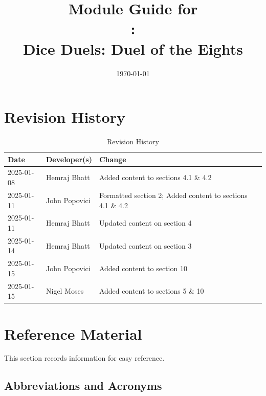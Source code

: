 \documentclass[12pt, titlepage]{article}
\begin{document}
\title{Module Guide for \\\progname: \\Dice Duels: Duel of the Eights} 
\author{\authname}
\date{\today}

\maketitle


\section{Revision History}

\begin{table}[hp]
\caption{Revision History} \label{TblRevisionHistory}
\begin{tabularx}{\textwidth}{llX}
\toprule
\textbf{Date} & \textbf{Developer(s)} & \textbf{Change}\\
\midrule
2025-01-08 & Hemraj Bhatt & Added content to sections 4.1 \& 4.2\\
2025-01-11 & John Popovici & Formatted section 2; Added content to sections 4.1 \& 4.2\\
2025-01-11 & Hemraj Bhatt & Updated content on section 4\\
2025-01-14 & Hemraj Bhatt & Updated content on section 3\\
2025-01-15 & John Popovici & Added content to section 10\\
2025-01-15 & Nigel Moses & Added content to sections 5 \& 10\\
\bottomrule
\end{tabularx}
\end{table}

\newpage

\section{Reference Material}

This section records information for easy reference.

\subsection{Abbreviations and Acronyms}
\end{document}
